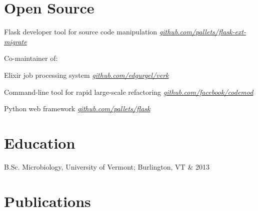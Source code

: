\documentclass[letterpaper]{scrartcl}
\begin{document}
%
%

\section*{Open Source}

\begin{list1}
\item
  \begin{list2}
  \item Flask developer tool for source code manipulation \hfill \href{https://github.com/pallets/flask-ext-migrate}{\emph{github.com/pallets/flask-ext-migrate}}

  \item Co-maintainer of:

    \begin{list3}
    \item Elixir job processing system \hfill \href{https://github.com/edgurgel/verk}{\emph{github.com/edgurgel/verk}}
    \item Command-line tool for rapid large-scale refactoring \hfill \href{https://github.com/facebook/codemod}{\emph{github.com/facebook/codemod}}
    \item Python web framework \hfill \href{https://github.com/pallets/flask}{\emph{github.com/pallets/flask}}
    \end{list3}

  \end{list2}
\end{list1}

%
%

\section*{Education}

\begin{list1}
  \item\begin{tabular1bold}B.Sc. Microbiology, University of Vermont; Burlington, VT & 2013\end{tabular1bold}
\end{list1}

%
%

\section*{Publications}
\end{document}
